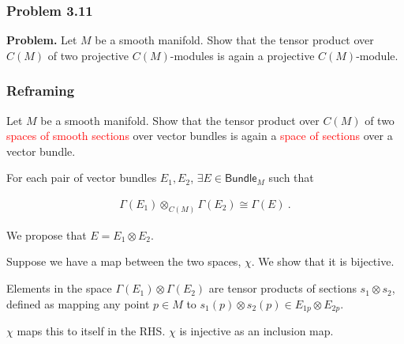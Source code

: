 \begin{frame}
    \frametitle{Problem 3.11}

    \textbf{Problem. } Let \(M\) be a smooth manifold. Show that the tensor product over \(C(M)\)
    of two projective \(C(M)\)-modules is again a projective \(C(M)\)-module.


\end{frame}

\begin{frame}
    \frametitle{Reframing}

    Let \(M\) be a smooth manifold. Show that the tensor product over \(C(M)\)
    of two \textcolor{red}{spaces of smooth sections} over vector bundles is
    again a \textcolor{red}{space of sections} over a vector bundle. \\ \pause

    For each pair of vector bundles \(E_1, E_2\), \(\exists E \in
    \textsf{Bundle}_M\) such that 
    
    \begin{gather*}        
        \Gamma(E_1) \otimes_{C(M)} \Gamma(E_2) \cong \Gamma(E)~.
    \end{gather*}



\end{frame}

\begin{frame}

    We propose that \(E = E_1\otimes E_2\). \pause

    Suppose we have a map between the two spaces, \(\chi\). We show that it is
    bijective. \pause

    Elements in the space \(\Gamma(E_1) \otimes \Gamma(E_2)\) are tensor
    products of sections \(s_1 \otimes s_2\), defined as mapping any point \(p
    \in M\) to \(s_1(p)\otimes s_2(p) \in E_{1p} \otimes E_{2p}\). \\ \pause

    \(\chi\) maps this to itself in the RHS. \(\chi\) is injective as an
    inclusion map.


\end{frame}

